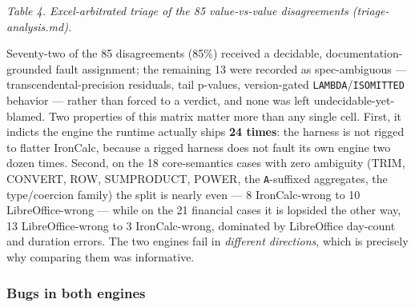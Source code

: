 \documentclass[
]{article}
\newcounter{none} %
\begin{document}
\emph{Table 4. Excel-arbitrated triage of the 85 value-vs-value
disagreements (triage-analysis.md).}

Seventy-two of the 85 disagreements (85\%) received a decidable,
documentation-grounded fault assignment; the remaining 13 were recorded
as spec-ambiguous --- transcendental-precision residuals, tail p-values,
version-gated \texttt{LAMBDA}/\texttt{ISOMITTED} behavior --- rather
than forced to a verdict, and none was left undecidable-yet-blamed. Two
properties of this matrix matter more than any single cell. First, it
indicts the engine the runtime actually ships \textbf{24 times}: the
harness is not rigged to flatter IronCalc, because a rigged harness does
not fault its own engine two dozen times. Second, on the 18
core-semantics cases with zero ambiguity (TRIM, CONVERT, ROW,
SUMPRODUCT, POWER, the \texttt{A}-suffixed aggregates, the type/coercion
family) the split is nearly even --- 8 IronCalc-wrong to 10
LibreOffice-wrong --- while on the 21 financial cases it is lopsided the
other way, 13 LibreOffice-wrong to 3 IronCalc-wrong, dominated by
LibreOffice day-count and duration errors. The two engines fail in
\emph{different directions}, which is precisely why comparing them was
informative.

\subsubsection{Bugs in both engines}\label{bugs-in-both-engines}
\end{document}
